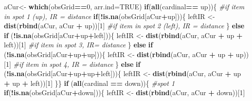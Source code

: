 \documentclass[]{article}
\newenvironment{Shaded}{\begin{snugshade}}{\end{snugshade}}
\newcommand{\CommentTok}[1]{\textcolor[rgb]{0.56,0.35,0.01}{\textit{#1}}}
\newcommand{\ControlFlowTok}[1]{\textcolor[rgb]{0.13,0.29,0.53}{\textbf{#1}}}
\newcommand{\DataTypeTok}[1]{\textcolor[rgb]{0.13,0.29,0.53}{#1}}
\newcommand{\DecValTok}[1]{\textcolor[rgb]{0.00,0.00,0.81}{#1}}
\newcommand{\KeywordTok}[1]{\textcolor[rgb]{0.13,0.29,0.53}{\textbf{#1}}}
\newcommand{\NormalTok}[1]{#1}
\newcommand{\OperatorTok}[1]{\textcolor[rgb]{0.81,0.36,0.00}{\textbf{#1}}}
\newcommand{\OtherTok}[1]{\textcolor[rgb]{0.56,0.35,0.01}{#1}}
\newcommand{\StringTok}[1]{\textcolor[rgb]{0.31,0.60,0.02}{#1}}
\begin{document}
\begin{Shaded}
\begin{Highlighting}[]
\NormalTok{  aCur<-}\StringTok{ }\KeywordTok{which}\NormalTok{(obsGrid}\OperatorTok{==}\DecValTok{0}\NormalTok{, }\DataTypeTok{arr.ind=}\OtherTok{TRUE}\NormalTok{)}
  \ControlFlowTok{if}\NormalTok{(}\KeywordTok{all}\NormalTok{(cardinal}\OperatorTok{==}\StringTok{ }\NormalTok{up))\{ }
    \CommentTok{#if item in spot 1 (up), IR = distance}
    \ControlFlowTok{if}\NormalTok{(}\OperatorTok{!}\KeywordTok{is.na}\NormalTok{(obsGrid[aCur}\OperatorTok{+}\NormalTok{up]))\{}
\NormalTok{      leftIR <-}\StringTok{ }\KeywordTok{dist}\NormalTok{(}\KeywordTok{rbind}\NormalTok{(aCur, aCur }\OperatorTok{+}\StringTok{ }\NormalTok{up))[}\DecValTok{1}\NormalTok{]}
      \CommentTok{#if item in spot 2 (left), IR = distance}
\NormalTok{    \} }\ControlFlowTok{else} \ControlFlowTok{if}\NormalTok{ (}\OperatorTok{!}\KeywordTok{is.na}\NormalTok{(obsGrid[aCur}\OperatorTok{+}\NormalTok{up}\OperatorTok{+}\NormalTok{left]))\{}
\NormalTok{      leftIR <-}\StringTok{ }\KeywordTok{dist}\NormalTok{(}\KeywordTok{rbind}\NormalTok{(aCur, aCur }\OperatorTok{+}\StringTok{ }\NormalTok{up }\OperatorTok{+}\StringTok{ }\NormalTok{left))[}\DecValTok{1}\NormalTok{]}
      \CommentTok{#if item in spot 3, IR= distance}
\NormalTok{    \} }\ControlFlowTok{else} \ControlFlowTok{if}\NormalTok{ (}\OperatorTok{!}\KeywordTok{is.na}\NormalTok{(obsGrid[aCur}\OperatorTok{+}\NormalTok{up}\OperatorTok{+}\NormalTok{up]))\{}
\NormalTok{     leftIR <-}\StringTok{ }\KeywordTok{dist}\NormalTok{(}\KeywordTok{rbind}\NormalTok{(aCur, aCur }\OperatorTok{+}\StringTok{ }\NormalTok{up }\OperatorTok{+}\StringTok{ }\NormalTok{up))[}\DecValTok{1}\NormalTok{]}
      \CommentTok{#if item in spot 4, IR = distance}
\NormalTok{    \} }\ControlFlowTok{else} \ControlFlowTok{if}\NormalTok{ (}\OperatorTok{!}\KeywordTok{is.na}\NormalTok{(obsGrid[aCur}\OperatorTok{+}\NormalTok{up}\OperatorTok{+}\NormalTok{up}\OperatorTok{+}\NormalTok{left]))\{}
\NormalTok{      leftIR <-}\StringTok{ }\KeywordTok{dist}\NormalTok{(}\KeywordTok{rbind}\NormalTok{(aCur, aCur }\OperatorTok{+}\StringTok{ }\NormalTok{up }\OperatorTok{+}\StringTok{ }\NormalTok{up }\OperatorTok{+}\StringTok{ }\NormalTok{left))[}\DecValTok{1}\NormalTok{]}
\NormalTok{    \}\}}
   \ControlFlowTok{if}\NormalTok{ (}\KeywordTok{all}\NormalTok{(cardinal }\OperatorTok{==}\StringTok{ }\NormalTok{down))\{}
    \CommentTok{#spot 1}
    \ControlFlowTok{if}\NormalTok{(}\OperatorTok{!}\KeywordTok{is.na}\NormalTok{(obsGrid[aCur}\OperatorTok{+}\NormalTok{down]))\{}
\NormalTok{         leftIR <-}\StringTok{ }\KeywordTok{dist}\NormalTok{(}\KeywordTok{rbind}\NormalTok{(aCur, aCur }\OperatorTok{+}\StringTok{ }\NormalTok{down))[}\DecValTok{1}\NormalTok{]}

\end{Highlighting}
\end{Shaded}
\end{document}
